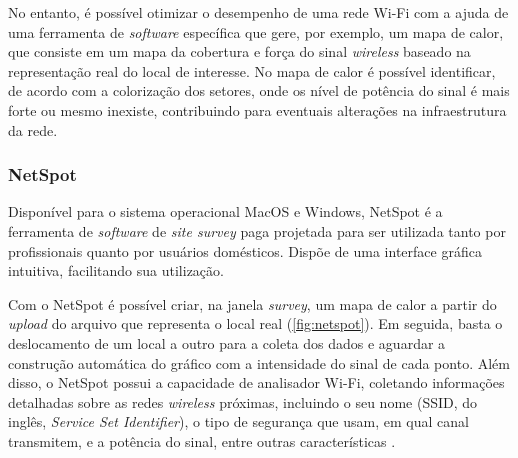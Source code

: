 No entanto, é possível otimizar o desempenho de uma rede Wi-Fi com a ajuda de uma ferramenta de \textit{software} específica que gere, por exemplo, um mapa de calor, que consiste em um mapa da cobertura e força do sinal \textit{wireless} baseado na representação real do local de interesse. No mapa de calor é possível identificar, de acordo com a colorização dos setores, onde os nível de potência do sinal é mais forte ou mesmo inexiste, contribuindo para eventuais alterações na infraestrutura da rede.

\subsubsection{NetSpot}
\label{subsubsec:netspot}

Disponível para o sistema operacional MacOS e Windows, NetSpot é a ferramenta de \textit{software} de \textit{site survey} paga projetada para ser utilizada tanto por profissionais quanto por usuários domésticos. Dispõe de uma interface gráfica intuitiva, facilitando sua utilização.

Com o NetSpot é possível criar, na janela \textit{survey}, um mapa de calor a partir do \textit{upload} do arquivo que representa o local real (\autoref{fig:netspot}). Em seguida, basta o deslocamento de um local a outro para a coleta dos dados e aguardar a construção automática do gráfico com a intensidade do sinal de cada ponto. Além disso, o NetSpot possui a capacidade de analisador Wi-Fi, coletando informações detalhadas sobre as redes \textit{wireless} próximas, incluindo o seu nome (SSID, do inglês, \textit{Service Set Identifier}), o tipo de segurança que usam, em qual canal transmitem, e a potência do sinal, entre outras características \cite{Netspot2019}.

\begin{figure}[H]
	\centering
\end{figure}

